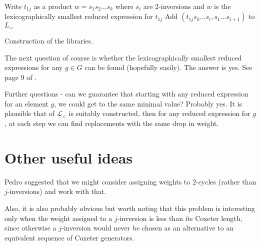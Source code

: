 \documentclass{article}
\begin{document}
\begin{algorithm}
 \SetAlgoLined
 {
  Write $t_{1j}$ as a product  $w=s_1 s_ 2 \hdots s_k$ where $s_i$ are 2-inversions and $w$ is the lexicographically smallest reduced expression for $t_{1j}$ \;
  {
   {
    Add $(t_{1j}s_k \hdots s_i,s_1 \hdots s_{i+1})$ to $L_{=}$
    } 
  }
 }
\caption{Construction of the libraries.}\label{algo:libconst}
\end{algorithm}
The next question of course is whether the lexicographically smallest reduced expressions for any $g \in G$ can be found (hopefully easily). The answer is yes. See page 9 of \cite{green2001characters}.

Further questions - can we guarantee that starting with any reduced expression for an element $g$, we could get to the same minimal value? Probably yes. It is plausible that of $\mathcal{L}_{<}$ is suitably constructed, then for any reduced expression for $g$, at each step we can find replacements with the same drop in weight.



\section{Other useful ideas}
Pedro suggested that we might consider assigning weights to 2-cycles (rather than $j$-inversions) and work with that.

Also, it is also probably obvious but worth noting that this problem is interesting only when the weight assigned to a $j$-inversion is less than its Coxeter length, since otherwise a $j$-inversion would never be chosen as an alternative to an equivalent sequence of Coxeter generators.
\end{document}

